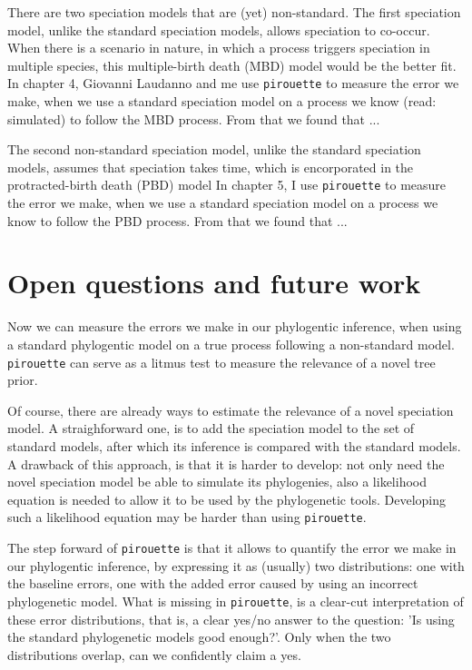 There are two speciation models that are (yet) non-standard.
The first speciation model, 
unlike the standard speciation models, 
allows speciation to co-occur.
When there is a scenario in nature, in which a process triggers speciation
in multiple species, this multiple-birth death (MBD) model would be the better fit. 
In chapter 4, Giovanni Laudanno and me 
use \verb;pirouette; to 
measure the error we make, 
when we use a standard speciation model on a process we know (read: simulated) 
to follow the MBD process.
From that we found that ...

The second non-standard speciation model,
unlike the standard speciation models,
assumes that speciation takes time,
which is encorporated in the protracted-birth death (PBD) model
In chapter 5, I 
use \verb;pirouette; to 
measure the error we make, when we use a standard speciation
model on a process we know to follow the PBD process.
From that we found that ...

\section{Open questions and future work}

Now we can measure the errors we make in our phylogentic
inference, when using a standard phylogentic model on a
true process following a non-standard model. 
\verb;pirouette; can serve as a litmus test 
to measure the relevance of a novel tree prior. 

Of course, there are already ways to estimate the relevance of a
novel speciation model. A straighforward one, is to add the speciation
model to the set of standard models, after which its inference is
compared with the standard models. A drawback of this approach, is
that it is harder to develop: not only need the novel speciation model
be able to simulate its phylogenies, also a likelihood equation is needed
to allow it to be used by the phylogenetic tools. Developing such a
likelihood equation may be harder than using \verb;pirouette;.

The step forward of \verb;pirouette; is that it allows 
to quantify the error we make in our phylogentic inference, by
expressing it as (usually) two distributions: one with the baseline errors,
one with the added error caused by using an incorrect phylogenetic model.
What is missing in \verb;pirouette;, is a clear-cut interpretation of these 
error distributions, that is, a clear yes/no answer to the question: 'Is
using the standard phylogenetic models good enough?'. Only when the two
distributions overlap, can we confidently claim a yes. 

